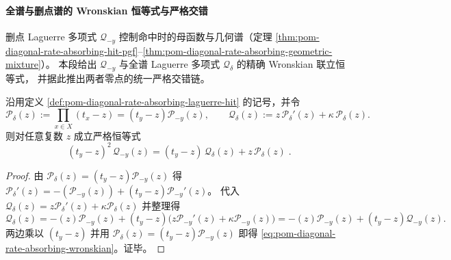 \paragraph{全谱与删点谱的 Wronskian 恒等式与严格交错}
删点 Laguerre 多项式 \(\mathcal Q_{-y}\) 控制命中时的母函数与几何谱（定理 \ref{thm:pom-diagonal-rate-absorbing-hit-pgf}--\ref{thm:pom-diagonal-rate-absorbing-geometric-mixture}）。
本段给出 \(\mathcal Q_{-y}\) 与全谱 Laguerre 多项式 \(\mathcal Q_\delta\) 的精确 Wronskian 联立恒等式，
并据此推出两者零点的统一严格交错链。

\begin{proposition}\label{prop:pom-diagonal-rate-absorbing-wronskian-identity-secondary}
沿用定义 \ref{def:pom-diagonal-rate-absorbing-laguerre-hit} 的记号，并令
\[
\mathcal P_\delta(z):=\prod_{x\in X}(t_x-z)=(t_y-z)\mathcal P_{-y}(z),
\qquad
\mathcal Q_\delta(z):=z\,\mathcal P_\delta'(z)+\kappa\,\mathcal P_\delta(z).
\]
则对任意复数 \(z\) 成立严格恒等式
\begin{equation}\label{eq:pom-diagonal-rate-absorbing-wronskian}
\boxed{\;
(t_y-z)^2\,\mathcal Q_{-y}(z)
=(t_y-z)\,\mathcal Q_\delta(z)+z\,\mathcal P_\delta(z)\; } .
\end{equation}
\end{proposition}
\begin{proof}
由 \(\mathcal P_\delta(z)=(t_y-z)\mathcal P_{-y}(z)\) 得
\(
\mathcal P_\delta'(z)=-(\mathcal P_{-y}(z))+(t_y-z)\mathcal P_{-y}'(z)
\)。
代入 \(\mathcal Q_\delta(z)=z\mathcal P_\delta'(z)+\kappa\mathcal P_\delta(z)\) 并整理得
\[
\mathcal Q_\delta(z)
=-(z)\mathcal P_{-y}(z)+(t_y-z)\bigl(z\mathcal P_{-y}'(z)+\kappa\mathcal P_{-y}(z)\bigr)
=-(z)\mathcal P_{-y}(z)+(t_y-z)\mathcal Q_{-y}(z).
\]
两边乘以 \((t_y-z)\) 并用 \(\mathcal P_\delta(z)=(t_y-z)\mathcal P_{-y}(z)\) 即得 \eqref{eq:pom-diagonal-rate-absorbing-wronskian}。证毕。
\end{proof}

